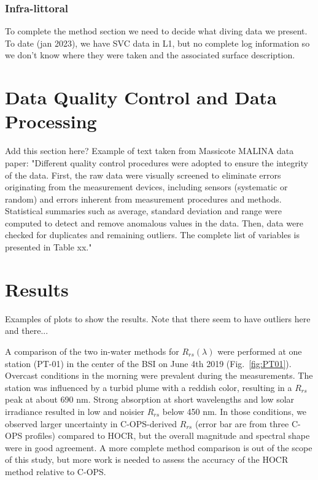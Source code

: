 \documentclass[essd, manuscript]{copernicus}
\begin{document}
\subsubsection{Infra-littoral}
To complete the method section we need to decide what diving data we present. To date (jan 2023), we have SVC data in L1, but no complete log information so we don't know where they were taken and the associated surface description.

\section{Data Quality Control and Data Processing}
Add this section here? Example of text taken from Massicote MALINA data paper: "Different quality control procedures were adopted to ensure the integrity of the data. First, the raw data were visually screened to eliminate errors originating from the measurement devices, including sensors (systematic or random) and errors inherent from measurement procedures and methods. Statistical summaries such as average, standard deviation and range were computed to detect and remove anomalous values in the data. Then, data were checked for duplicates and remaining outliers. The complete list of variables is presented in Table xx."

\section{Results}
\label{sec:Results}
Examples of plots to show the results. Note that there seem to have outliers here and there...

A comparison of the two in-water methods for $R_{rs}(\lambda)$ were performed at one station (PT-01) in the center of the BSI on June 4th 2019 (Fig.~\ref{fig:PT01}). Overcast conditions in the morning  were prevalent during the measurements. The station was influenced by a turbid plume with a reddish color, resulting in a $R_{rs}$ peak at about 690 nm. Strong absorption at short wavelengths and low solar irradiance resulted in low and noisier $R_{rs}$ below 450 nm. In those conditions, we observed larger uncertainty in C-OPS-derived $R_{rs}$ (error bar are from three C-OPS profiles) compared to HOCR, but the overall magnitude and spectral shape were in good agreement. A more complete method comparison is out of the scope of this study, but more work is needed to assess the accuracy of the HOCR method relative to C-OPS. 
\end{document}
